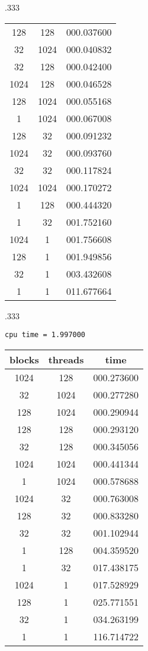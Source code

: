 \documentclass[12pt]{article}
\begin{document}
\begin{table*}[!htb]
\begin{subtable}{.333\linewidth}
\begin{tabular}{|c|c|c|}
			128    & 128     & 000.037600 \\
			32     & 1024    & 000.040832 \\
			32     & 128     & 000.042400 \\
			1024   & 128     & 000.046528 \\
			128    & 1024    & 000.055168 \\
			1      & 1024    & 000.067008 \\
			128    & 32      & 000.091232 \\
			1024   & 32      & 000.093760 \\
			32     & 32      & 000.117824 \\
			1024   & 1024    & 000.170272 \\
			1      & 128     & 000.444320 \\
			1      & 32      & 001.752160 \\
			1024   & 1       & 001.756608 \\
			128    & 1       & 001.949856 \\
			32     & 1       & 003.432608 \\
			1      & 1       & 011.677664 \\
			\hline
		\end{tabular}
	\end{subtable}
	\begin{subtable}{.333\linewidth}
		\caption{$10^6$ элементов}
		\centering

		\lstinline|cpu time = 1.997000|

		\begin{tabular}{|c|c|c|}
			\hline
			blocks & threads & time       \\
			\hline

			1024   & 128     & 000.273600 \\
			32     & 1024    & 000.277280 \\
			128    & 1024    & 000.290944 \\
			128    & 128     & 000.293120 \\
			32     & 128     & 000.345056 \\
			1024   & 1024    & 000.441344 \\
			1      & 1024    & 000.578688 \\
			1024   & 32      & 000.763008 \\
			128    & 32      & 000.833280 \\
			32     & 32      & 001.102944 \\
			1      & 128     & 004.359520 \\
			1      & 32      & 017.438175 \\
			1024   & 1       & 017.528929 \\
			128    & 1       & 025.771551 \\
			32     & 1       & 034.263199 \\
			1      & 1       & 116.714722 \\
			\hline
		\end{tabular}
	\end{subtable}

\end{table*}
\end{document}
